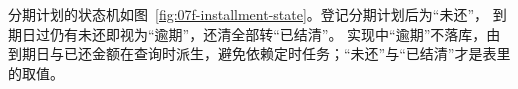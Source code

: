 分期计划的状态机如图~\ref{fig:07f-installment-state}。登记分期计划后为“未还”，
到期日过仍有未还即视为“逾期”，还清全部转“已结清”。
实现中“逾期”不落库，由到期日与已还金额在查询时派生，避免依赖定时任务；“未还”与“已结清”才是表里的取值。




